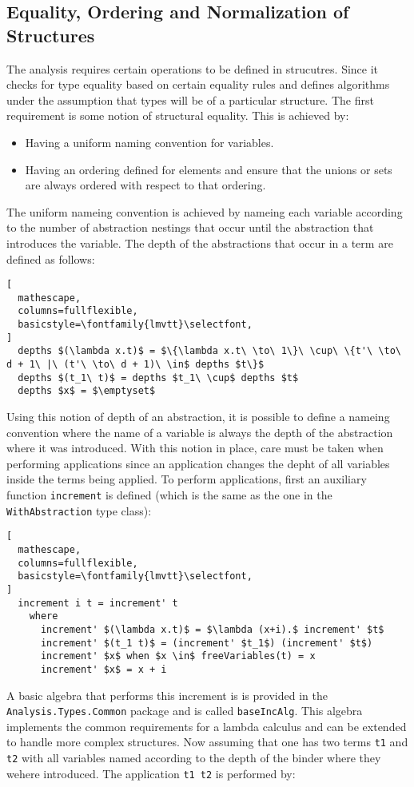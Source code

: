 \documentclass[8pt]{extarticle}
\begin{document}
\subsection{Equality, Ordering and Normalization of Structures}
The analysis requires certain operations to be defined in strucutres. Since it checks for type equality based on certain equality rules and defines algorithms under the assumption that types will be of a particular structure. The first requirement is some notion of structural equality. This is achieved by:
\begin{itemize}
\item Having a uniform naming convention for variables.
\item Having an ordering defined for elements and ensure that the unions or sets are always ordered with respect to that ordering.
\end{itemize}
The uniform nameing convention is achieved by nameing each variable according to the number of abstraction nestings that occur until the abstraction that introduces the variable. The depth of the abstractions that occur in a term are defined as follows:
\begin{lstlisting}[
  mathescape,
  columns=fullflexible,
  basicstyle=\fontfamily{lmvtt}\selectfont,
]
  depths $(\lambda x.t)$ = $\{\lambda x.t\ \to\ 1\}\ \cup\ \{t'\ \to\ d + 1\ |\ (t'\ \to\ d + 1)\ \in$ depths $t\}$
  depths $(t_1\ t)$ = depths $t_1\ \cup$ depths $t$
  depths $x$ = $\emptyset$
\end{lstlisting}
Using this notion of depth of an abstraction, it is possible to define a nameing convention where the name of a variable is always the depth of the abstraction where it was introduced. With this notion in place, care must be taken when performing applications since an application changes the depht of all variables inside the terms being applied. To perform applications, first an auxiliary function \verb+increment+ is defined (which is the same as the one in the \verb+WithAbstraction+ type class):
\begin{lstlisting}[
  mathescape,
  columns=fullflexible,
  basicstyle=\fontfamily{lmvtt}\selectfont,
]
  increment i t = increment' t
    where
      increment' $(\lambda x.t)$ = $\lambda (x+i).$ increment' $t$
      increment' $(t_1 t)$ = (increment' $t_1$) (increment' $t$)
      increment' $x$ when $x \in$ freeVariables(t) = x
      increment' $x$ = x + i
\end{lstlisting}
A basic algebra that performs this increment is is provided in the \verb+Analysis.Types.Common+ package and is called \verb+baseIncAlg+. This algebra implements the common requirements for a lambda calculus and can be extended to handle more complex structures. Now assuming that one has two terms \verb+t1+ and \verb+t2+ with all variables named according to the depth of the binder where they wehere introduced. The application \verb+t1 t2+ is performed by:
\end{document}
